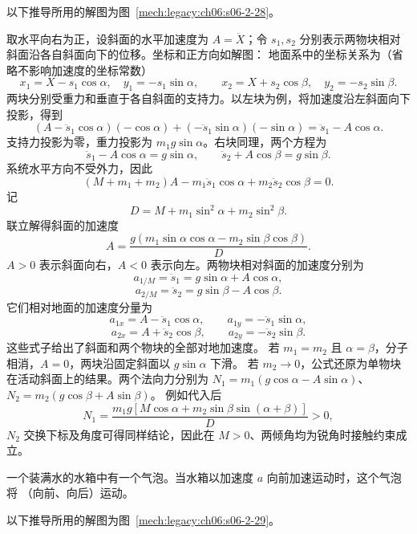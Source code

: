 {\begin{xesolution}
以下推导所用的解图为图~\ref{mech:legacy:ch06:s06-2-28}。

取水平向右为正，设斜面的水平加速度为 $A=\ddot X$；令 $s_1,s_2$ 分别表示两物块相对
斜面沿各自斜面向下的位移。坐标和正方向如解图：
\soldiagTwoTwentyEight
地面系中的坐标关系为（省略不影响加速度的坐标常数）
\[
 x_1=X-s_1\cos\alpha,\quad y_1=-s_1\sin\alpha,
 \qquad x_2=X+s_2\cos\beta,\quad y_2=-s_2\sin\beta.
\]
两块分别受重力和垂直于各自斜面的支持力。以左块为例，将加速度沿左斜面向下投影，得到
\[
 (A-\ddot s_1\cos\alpha)(-\cos\alpha)
 +(-\ddot s_1\sin\alpha)(-\sin\alpha)
 =\ddot s_1-A\cos\alpha.
\]
支持力投影为零，重力投影为 $m_1g\sin\alpha$。右块同理，两个方程为
\[
 \ddot s_1-A\cos\alpha=g\sin\alpha,
 \qquad
 \ddot s_2+A\cos\beta=g\sin\beta.
\]
系统水平方向不受外力，因此
\[
 (M+m_1+m_2)A-m_1\ddot s_1\cos\alpha
 +m_2\ddot s_2\cos\beta=0.
\]
记
\[
 D=M+m_1\sin^2\alpha+m_2\sin^2\beta.
\]
联立解得斜面的加速度
\[
 \boxed{A=\frac{g\left(m_1\sin\alpha\cos\alpha
 -m_2\sin\beta\cos\beta\right)}{D}}.
\]
$A>0$ 表示斜面向右，$A<0$ 表示向左。两物块相对斜面的加速度分别为
\[
 \boxed{a_{1/\!M}=\ddot s_1=g\sin\alpha+A\cos\alpha},
\]
\[
 \boxed{a_{2/\!M}=\ddot s_2=g\sin\beta-A\cos\beta}.
\]
它们相对地面的加速度分量为
\[
 \boxed{
 a_{1x}=A-\ddot s_1\cos\alpha,
 \qquad
 a_{1y}=-\ddot s_1\sin\alpha},
\]
\[
 \boxed{
 a_{2x}=A+\ddot s_2\cos\beta,
 \qquad
 a_{2y}=-\ddot s_2\sin\beta}.
\]
这些式子给出了斜面和两个物块的全部对地加速度。
若 $m_1=m_2$ 且 $\alpha=\beta$，分子相消，$A=0$，两块沿固定斜面以 $g\sin\alpha$ 下滑。
若 $m_2\to0$，公式还原为单物块在活动斜面上的结果。两个法向力分别为
$N_1=m_1(g\cos\alpha-A\sin\alpha)$、$N_2=m_2(g\cos\beta+A\sin\beta)$。
例如代入后
\[
 N_1=\frac{m_1g[M\cos\alpha+m_2\sin\beta\sin(\alpha+\beta)]}{D}>0,
\]
$N_2$ 交换下标及角度可得同样结论，因此在 $M>0$、两倾角均为锐角时接触约束成立。
\end{xesolution}

\begin{origexamplebox}{}\label{ch06:ex:s06-2-29}
一个装满水的水箱中有一个气泡。当水箱以加速度 $a$ 向前加速运动时，这个气泡将
\underline{\hspace{3em}}（向前、向后）运动。
\probdiagTwoTwentyNine
\end{origexamplebox}

\begin{xesolution}
以下推导所用的解图为图~\ref{mech:legacy:ch06:s06-2-29}。


\end{xesolution}}
